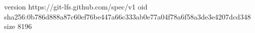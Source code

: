 version https://git-lfs.github.com/spec/v1
oid sha256:0b786d888a87c60ef76be447a66c333ab0e77a04f78a6f58a3de3e4207dcd348
size 8196
